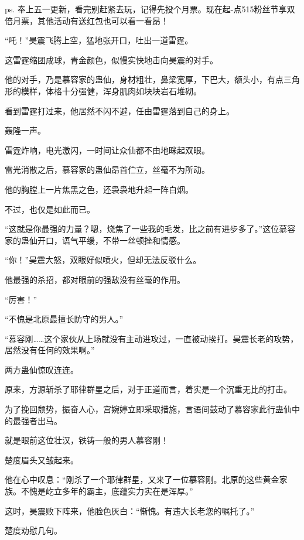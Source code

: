 
\begin{this_body}



ps. 奉上五一更新，看完别赶紧去玩，记得先投个月票。现在起-点515粉丝节享双倍月票，其他活动有送红包也可以看一看昂！

“吒！”昊震飞腾上空，猛地张开口，吐出一道雷霆。

这雷霆缩团成球，青金颜色，似慢实快地击向昊震的对手。

他的对手，乃是慕容家的蛊仙，身材粗壮，鼻梁宽厚，下巴大，额头小，有点三角形的模样，体格十分强健，浑身肌肉如块块岩石堆砌。

看到雷霆打过来，他居然不闪不避，任由雷霆落到自己的身上。

轰隆一声。

雷霆炸响，电光激闪，一时间让众仙都不由地眯起双眼。

雷光消散之后，慕容家的蛊仙昂首伫立，丝毫不为所动。

他的胸膛上一片焦黑之色，还袅袅地升起一阵白烟。

不过，也仅是如此而已。

“这就是你最强的力量？嗯，烧焦了一些我的毛发，比之前有进步多了。”这位慕容家的蛊仙开口，语气平缓，不带一丝顿挫和情感。

“你！”昊震大怒，双眼好似喷火，但却无法反驳什么。

他最强的杀招，都对眼前的强敌没有丝毫的作用。

“厉害！”

“不愧是北原最擅长防守的男人。”

“慕容刚……这个家伙从上场就没有主动进攻过，一直被动挨打。昊震长老的攻势，居然没有任何的效果啊。”

两方蛊仙惊叹连连。

原来，方源斩杀了耶律群星之后，对于正道而言，着实是一个沉重无比的打击。

为了挽回颓势，振奋人心，宫婉婷立即采取措施，言语间鼓动了慕容家此行蛊仙中的最强者出马。

就是眼前这位壮汉，铁铸一般的男人慕容刚！

楚度眉头又皱起来。

他在心中叹息：“刚杀了一个耶律群星，又来了一位慕容刚。北原的这些黄金家族。不愧是屹立多年的霸主，底蕴实力实在是浑厚。”

这时，昊震败下阵来，他脸色灰白：“惭愧。有违大长老您的嘱托了。”

楚度劝慰几句。


\end{this_body}
